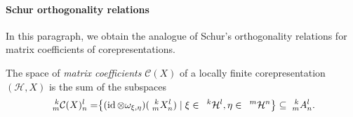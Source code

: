 \documentclass[12pt]{article}
\theoremstyle{change}
\DeclareMathOperator{\id}{id}
\newcommand{\Gr}[5]{\;{}^{\;#2}_{#4}#1_{#5}^{#3}}%
\newcommand{\Gru}[3]{\;{}^{\;#2}#1^{#3}}
\theoremstyle{definition}
\numberwithin{equation}{section}
\begin{document}
\paragraph{Schur orthogonality relations}
In this paragraph, we obtain the analogue of Schur's orthogonality
relations for matrix coefficients of corepresentations.

The space of \emph{matrix coefficients} $\mathcal{C}(X)$ of a locally
finite corepresentation $(\mathcal{H},X)$ is the sum of
the subspaces
\begin{align*}
  \Gr{\mathcal{C}(X)}{k}{l}{m}{n} &= \span \left\{ (\id \otimes
  \omega_{\xi,\eta})(\Gr{X}{k}{l}{m}{n}) \mid \xi \in
  \Gru{\mathcal{H}}{k}{l}, \eta \in \Gru{\mathcal{H}}{m}{n} \right\}
\subseteq \Gr{A}{k}{l}{m}{n}.
\end{align*}
\end{document}
